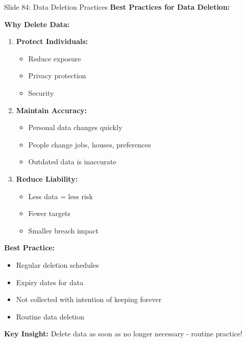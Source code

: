 \documentclass[8pt]{beamer}
\begin{document}
	\begin{frame}{Slide 84: Data Deletion Practices}
		\fontsize{6.5}{7.5}\selectfont
		\textbf{Best Practices for Data Deletion:}
		
		\vspace{0.1cm}
		\textbf{Why Delete Data:}
		\begin{enumerate}
			\item \textbf{Protect Individuals:}
			\begin{itemize}
				\item Reduce exposure
				\item Privacy protection
				\item Security
			\end{itemize}
			\item \textbf{Maintain Accuracy:}
			\begin{itemize}
				\item Personal data changes quickly
				\item People change jobs, houses, preferences
				\item Outdated data is inaccurate
			\end{itemize}
			\item \textbf{Reduce Liability:}
			\begin{itemize}
				\item Less data = less risk
				\item Fewer targets
				\item Smaller breach impact
			\end{itemize}
		\end{enumerate}
		
		\vspace{0.1cm}
		\textbf{Best Practice:}
		\begin{itemize}
			\item Regular deletion schedules
			\item Expiry dates for data
			\item Not collected with intention of keeping forever
			\item Routine data deletion
		\end{itemize}
		
		\textcolor{myblue}{\textbf{Key Insight:}} Delete data \textcolor{myblue}{as soon as no longer necessary} - routine practice!
	\end{frame}
	
\end{document}
